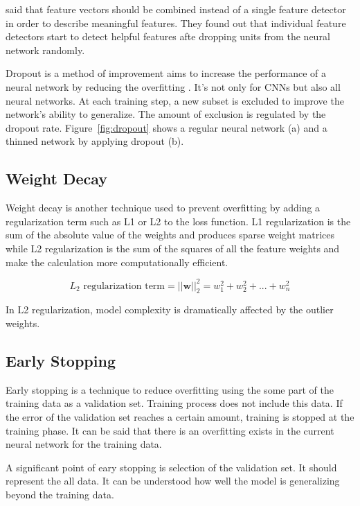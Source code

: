         \citet{srivastava2014dropout} said that feature vectors should be combined instead of a single feature detector in order to describe meaningful features.
        They found out that  individual feature detectors start to detect helpful features afte dropping units from the neural network randomly.

        

        Dropout is a method of improvement aims to increase the performance of a neural network by reducing the overfitting \cite{srivastava2014dropout}.
        It's not only for CNNs but also all neural networks. At each training step, a new subset is excluded to improve the network's ability to generalize.
        The amount of exclusion is regulated by the dropout rate.
        Figure~\ref{fig:dropout} shows a regular neural network (a) and a thinned network by applying dropout (b).

    \subsection{Weight Decay}

        Weight decay is another technique used to prevent overfitting by adding a regularization term such as L1 or L2 to the loss function.
        L1 regularization is the sum of the absolute value of the weights and produces sparse weight matrices while L2 regularization is the sum of the squares of all the feature weights and make the calculation more computationally efficient.

        $$L_2\text{ regularization term} = ||\boldsymbol w||_2^2 = {w_1^2 + w_2^2 + ... + w_n^2}$$

        In L2 regularization, model complexity is dramatically affected by the outlier weights.

    \subsection{Early Stopping}

        Early stopping is a technique to reduce overfitting using the some part of the training data as a validation set.
        Training process does not include this data.
        If the error of the validation set reaches a certain amount, training is stopped at the training phase.
        It can be said that there is an overfitting exists in the current neural network for the training data.

        A significant point of eary stopping is selection of the validation set.
        It should represent the all data. It can be understood how well the model is generalizing beyond the training data.
